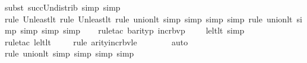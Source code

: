 \begin{isabellebody}
{\isacharparenleft}{\kern0pt}subst\ succ{\isacharunderscore}{\kern0pt}Un{\isacharunderscore}{\kern0pt}distrib{\isacharcomma}{\kern0pt}\ simp{\isacharcomma}{\kern0pt}\ simp{\isacharparenright}{\kern0pt}{\isacharplus}{\kern0pt}\isanewline
\ \ \ \isamarkupfalse%
{\isacharparenleft}{\kern0pt}rule\ Un{\isacharunderscore}{\kern0pt}least{\isacharunderscore}{\kern0pt}lt{\isacharcomma}{\kern0pt}\ rule\ Un{\isacharunderscore}{\kern0pt}least{\isacharunderscore}{\kern0pt}lt{\isacharcomma}{\kern0pt}\ rule\ union{\isacharunderscore}{\kern0pt}lt{}{\isacharcomma}{\kern0pt}\ simp{\isacharcomma}{\kern0pt}\ simp{\isacharcomma}{\kern0pt}\ simp{\isacharcomma}{\kern0pt}\ simp{\isacharcomma}{\kern0pt}\ rule\ union{\isacharunderscore}{\kern0pt}lt{}{\isacharcomma}{\kern0pt}\ simp{\isacharcomma}{\kern0pt}\ simp{\isacharcomma}{\kern0pt}\ simp{\isacharcomma}{\kern0pt}\ simp{\isacharparenright}{\kern0pt}{\isacharplus}{\kern0pt}\isanewline
\ \ \ \isamarkupfalse%
{\isacharparenleft}{\kern0pt}rule{\isacharunderscore}{\kern0pt}tac\ b{\isacharequal}{\kern0pt}{\isachardoublequoteopen}arity{\isacharparenleft}{\kern0pt}{\isacharparenleft}{\kern0pt}{\isasymlambda}p{\isachardot}{\kern0pt}\ incr{\isacharunderscore}{\kern0pt}bv{\isacharparenleft}{\kern0pt}p{\isacharparenright}{\kern0pt}\ {\isacharbackquote}{\kern0pt}\ {}{\isacharparenright}{\kern0pt}{\isacharcircum}{\kern0pt}{}{}\ {\isacharparenleft}{\kern0pt}{\isasymphi}{\isacharparenright}{\kern0pt}{\isacharparenright}{\kern0pt}{\isachardoublequoteclose}\ \ le{\isacharunderscore}{\kern0pt}lt{\isacharunderscore}{\kern0pt}lt{\isacharcomma}{\kern0pt}\ simp{\isacharparenright}{\kern0pt}\isanewline
\ \ \ \isamarkupfalse%
{\isacharparenleft}{\kern0pt}rule{\isacharunderscore}{\kern0pt}tac\ le{\isacharunderscore}{\kern0pt}lt{\isacharunderscore}{\kern0pt}lt{\isacharparenright}{\kern0pt}\isanewline
\ \ \ \ \isamarkupfalse%
{\isacharparenleft}{\kern0pt}rule\ arity{\isacharunderscore}{\kern0pt}incr{\isacharunderscore}{\kern0pt}bv{\isacharunderscore}{\kern0pt}le{\isacharparenright}{\kern0pt}\isanewline
\ \ \ \ \ \ \isamarkupfalse%
\ auto{\isacharbrackleft}{\kern0pt}{}{\isacharbrackright}{\kern0pt}\isanewline
\ \ \isamarkupfalse%
{\isacharparenleft}{\kern0pt}rule\ union{\isacharunderscore}{\kern0pt}lt{}{\isacharcomma}{\kern0pt}\ simp{\isacharcomma}{\kern0pt}\ simp{\isacharcomma}{\kern0pt}\ simp{\isacharcomma}{\kern0pt}\ simp{\isacharparenright}{\kern0pt}\isanewline

\end{isabellebody}
